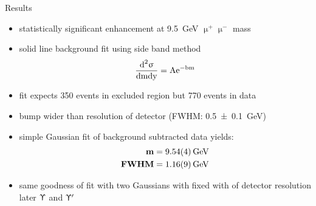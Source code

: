 \begin{frame}{Results}
 
	\begin{minipage}[c][.8\textheight]{.78\textwidth}
		\begin{itemize}
			\itemfill
			\item statistically significant enhancement at \SI{9.5}{\giga\electronvolt} $\upmu^{+}\upmu^{-}$ mass
			\item solid line background fit using side band method
			\begin{equation*} \dfrac{\z{d}^2\upsigma}{\z{dmdy}} = \z{A}\mathrm{e}^{-\z{bm}} \end{equation*}
			\item fit expects 350 events in excluded region but 770 events in data
			\item bump wider than resolution of detector (FWHM: \SI{.5\pm.1}{\giga\electronvolt})
			\item simple Gaussian fit of background subtracted data yields:
			{\begin{align*}
				\z{\textbf{m}} &= \textbf{\SI{9.54\pm.04}{\giga\electronvolt}}\\
				\z{\textbf{FWHM}} &= \textbf{\SI{1.16\pm.09}{\giga\electronvolt}}
			\end{align*}}
			\item same goodness of fit with two Gaussians with fixed with of detector resolution \ra later $\Upupsilon$ and $\Upupsilon'$

		\end{itemize}

	\end{minipage}
	\begin{minipage}{.2\textwidth}
	\end{minipage}

	
\end{frame}

